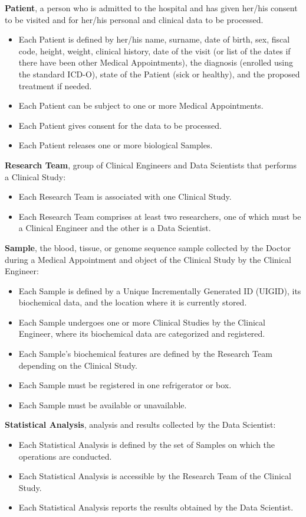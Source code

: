 \textbf{Patient}, a person who is admitted to the hospital and has given her/his consent to be visited and for her/his personal and clinical data to be processed.
\begin{itemize}
    \item Each Patient is defined by her/his name, surname, date of birth, sex, fiscal code, height, weight, clinical history, date of the visit (or list of the dates if there have been other Medical Appointments), the diagnosis (enrolled using the standard ICD-O), state of the Patient (sick or healthy), and the proposed treatment if needed.
    \item Each Patient can be subject to one or more Medical Appointments.
    \item Each Patient gives consent for the data to be processed.
    \item Each Patient releases one or more biological Samples.
\end{itemize}
\textbf{Research Team}, group of Clinical Engineers and Data Scientists that performs a Clinical Study:
\begin{itemize}
    \item Each Research Team is associated with one Clinical Study.
    \item Each Research Team comprises at least two researchers, one of which must be a Clinical Engineer and the other is a Data Scientist.
\end{itemize}
\textbf{Sample}, the blood, tissue, or genome sequence sample collected by the Doctor during a Medical Appointment and object of the Clinical Study by the Clinical Engineer:
\begin{itemize}
    \item Each Sample is defined by a Unique Incrementally Generated ID (UIGID), its biochemical data, and the location where it is currently stored.
    \item Each Sample undergoes one or more Clinical Studies by the Clinical Engineer, where its biochemical data are categorized and registered.
    \item Each Sample's biochemical features are defined by the Research Team depending on the Clinical Study.
    \item Each Sample must be registered in one refrigerator or box.
    \item Each Sample must be available or unavailable.
\end{itemize}
\textbf{Statistical Analysis}, analysis and results collected by the Data Scientist:
\begin{itemize}
    \item Each Statistical Analysis is defined by the set of Samples on which the operations are conducted.
    \item Each Statistical Analysis is accessible by the Research Team of the Clinical Study.
    \item Each Statistical Analysis reports the results obtained by the Data Scientist.
\end{itemize}
